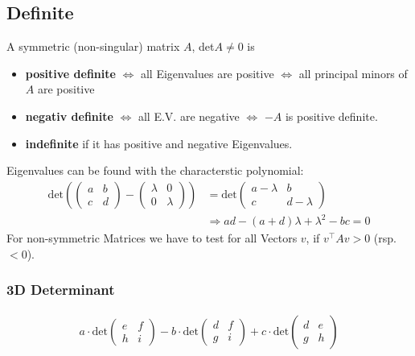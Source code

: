\documentclass[a4paper,fontsize = 8pt]{scrartcl}
\begin{document}
\subsection{Definite}
A symmetric (non-singular) matrix $A$, det$A \ne 0$ is
\begin{itemize}
  \item \textbf{positive definite} $\iff$ all Eigenvalues are positive $\iff$ all principal minors of $A$ are positive
  \item \textbf{negativ definite} $\iff$ all E.V. are negative $\iff$ $-A$ is positive definite.
  \item \textbf{indefinite} if it has positive and negative Eigenvalues.
\end{itemize}
Eigenvalues can be found with the characterstic polynomial:
\begin{align*}
  \text{det} \left(
  \begin{pmatrix}
    a & b\\
    c & d
  \end{pmatrix}
  -
  \begin{pmatrix}
    \lambda & 0\\
    0 & \lambda
  \end{pmatrix}
  \right)
  &=
  \text{det}
  \begin{pmatrix}
    a - \lambda & b\\
    c & d - \lambda
  \end{pmatrix}\\
  &\Rightarrow ad - (a + d) \lambda + \lambda^2 - bc = 0
\end{align*}
For non-symmetric Matrices we have to test for all Vectors \(v\), if \(v^\top A v > 0\) (rsp. \(< 0\)).
\subsubsection*{3D Determinant}
\begin{align*}
  a \cdot \text{det}
  \begin{pmatrix}
    e & f\\
    h & i
  \end{pmatrix}
  - b \cdot \text{det}
  \begin{pmatrix}
    d & f\\
    g & i
  \end{pmatrix}
  + c \cdot \text{det}
  \begin{pmatrix}
    d & e\\
    g & h
  \end{pmatrix}
\end{align*}
\end{document}
